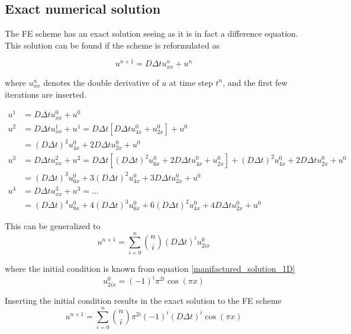 \subsection{Exact numerical solution}\label{exact_numerical_solution}

The FE scheme has an exact solution seeing as it is in fact a difference equation. 
This solution can be found if the scheme is reformulated as 

\begin{equation}
 u^{n+1} = D\Delta t u_{xx}^n + u^n
\end{equation}

where $u_{xx}^n$ denotes the double derivative of $u$ at time step $t^n$, and the first few iterations are inserted. 

\begin{align*}
 u^1 &= D\Delta t u_{xx}^0 + u^0 \\
 u^2 &= D\Delta t u_{xx}^1 + u^1 = D\Delta t\left[D\Delta t u_{4x}^0 + u_{2x}^0\right] + u^0\\
 &= \left(D\Delta t\right)^2 u_{4x}^0 + 2D\Delta t u_{2x}^0+ u^0 \\
 u^3 &= D\Delta t u_{xx}^2 + u^2 = D\Delta t\left[\left(D\Delta t\right)^2 u_{6x}^0 + 2D\Delta t u_{4x}^0+ u_{2x}^0\right] + \left(D\Delta t\right)^2 u_{4x}^0 + 2D\Delta t u_{2x}^0+ u^0\\
 &= \left(D\Delta t\right)^3 u_{6x}^0 + 3\left(D\Delta t\right)^2 u_{4x}^0+ 3D\Delta tu_{2x}^0 + u^0 \\
 u^4 &= D\Delta t u_{xx}^3 + u^3 = \dots \\
 &= \left(D\Delta t\right)^4 u_{8x}^0 + 4\left(D\Delta t\right)^3 u_{6x}^0+ 6\left(D\Delta t\right)^2 u_{4x}^0 + 4D\Delta t u_{2x}^0 + u^0 
\end{align*}

This can be generalized to 
\begin{equation}
 u^{n+1} = \sum\limits_{i=0}^n {n\choose i}\left(D\Delta t\right)^iu^0_{2ix}
\end{equation}

where the initial condition is known from equation \eqref{manifactured_solution_1D}
\begin{equation*}
 u^0_{2ix} = \left(-1\right)^i\pi^{2i}\cos(\pi x)
\end{equation*}

Inserting the initial condition results in the exact solution to the FE scheme
\begin{equation}
 u^{n+1} = \sum\limits_{i=0}^n {n\choose i}\pi^{2i}\left(-1\right)^i\left(D\Delta t\right)^i\cos(\pi x)
\end{equation}

